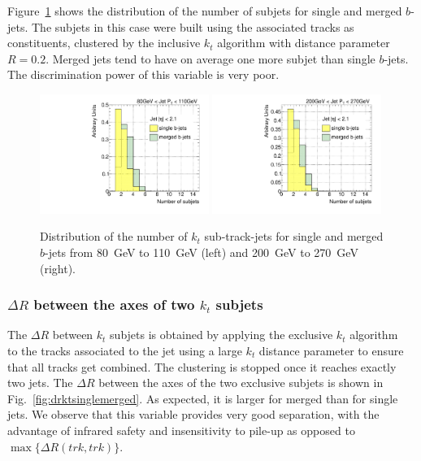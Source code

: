 Figure~\ref{fig:nsubjetsinglemerged} shows the distribution of the number of subjets for single and merged $b$-jets. The subjets in this case were built using the associated tracks as constituents, clustered by the inclusive $k_t$ algorithm with distance parameter $R=0.2$.  Merged jets tend to have on average one more subjet than single $b$-jets. The discrimination power of this variable is %
 very poor. 

\begin{figure}[tp]
\centering
\includegraphics[width=0.49\textwidth]{FIGS/VarsSingleMerged/Nsubjets080.pdf}
\includegraphics[width=0.49\textwidth]{FIGS/VarsSingleMerged/Nsubjets200.pdf}
\caption{Distribution of the number of $k_t$ sub-track-jets for single and merged $b$-jets from 80~GeV to 110~GeV (left) and 200~GeV to 270~GeV (right).}
\label{fig:nsubjetsinglemerged}
\end{figure}



\subsubsection{$\Delta R$ between the axes of two $k_t$ subjets}  

The $\Delta R$ between $k_t$ subjets is obtained by applying the exclusive $k_t$ algorithm~\cite{exclusivekt} to the tracks associated to the jet using a large $k_t$ distance parameter to ensure that all tracks get combined. The clustering is stopped once it reaches exactly two jets. The $\Delta R$ between the axes of the two exclusive subjets is shown in Fig.~\ref{fig:drktsinglemerged}.  As expected, it is larger for merged than for single jets. We observe that this
variable provides very good separation, with the advantage of infrared safety and insensitivity to pile-up as opposed to $\max\{\Delta R(trk,trk)\}$.

